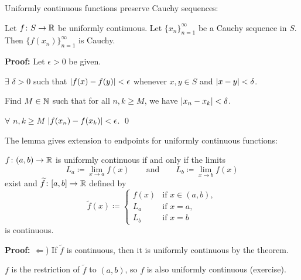 \documentclass[10pt,aspectratio=169]{beamer}
\begin{document}
\begin{frame}
Uniformly continuous functions preserve Cauchy sequences:

\begin{lemma}
Let $f \colon S \to {\mathbb{R}}$ be uniformly continuous.  Let
$\{ x_n \}_{n=1}^\infty$ be a Cauchy sequence in $S$.
Then $\bigl\{ f(x_n) \bigr\}_{n=1}^\infty$ is Cauchy.
\end{lemma}

\pause

\textbf{Proof:}
Let $\epsilon > 0$ be given.

\medskip
\pause

$\exists$ $\delta > 0$ such that
$\left\lvert {f(x)-f(y)} \right\rvert < \epsilon$ whenever $x,y \in S$ and $\left\lvert {x-y} \right\rvert < \delta$.

\medskip
\pause

Find $M \in {\mathbb{N}}$ such that for all $n, k \geq M$, we have $\left\lvert {x_n-x_k} \right\rvert < \delta$.

\medskip
\pause

\thus\quad
$\forall$ $n, k \geq M$ \quad $\left\lvert {f(x_n)-f(x_k)} \right\rvert < \epsilon$.
\qed

\end{frame}

\begin{frame}

The lemma gives extension to endpoints for uniformly continuous functions:

\begin{proposition}
$f \colon (a,b) \to {\mathbb{R}}$ is uniformly continuous if and only if
the limits 
\begin{equation*}
L_a \coloneqq \lim_{x \to a} f(x) \qquad \text{and} \qquad
L_b \coloneqq \lim_{x \to b} f(x)
\end{equation*}
exist and $\widetilde{f} \colon [a,b] \to {\mathbb{R}}$
defined by
\begin{equation*}
\widetilde{f}(x) \coloneqq
\begin{cases}
f(x) & \text{if } x \in (a,b), \\
L_a & \text{if } x = a, \\
L_b & \text{if } x = b
\end{cases}
\end{equation*}
is continuous.
\end{proposition}

\pause


\textbf{Proof:}
$\Leftarrow$)
If $\widetilde{f}$ is continuous, then
it is uniformly continuous by the theorem.

\pause
\medskip

$f$ is the restriction of $\widetilde{f}$ to $(a,b)$,
so $f$ is also uniformly continuous (exercise).

\end{frame}
\end{document}
